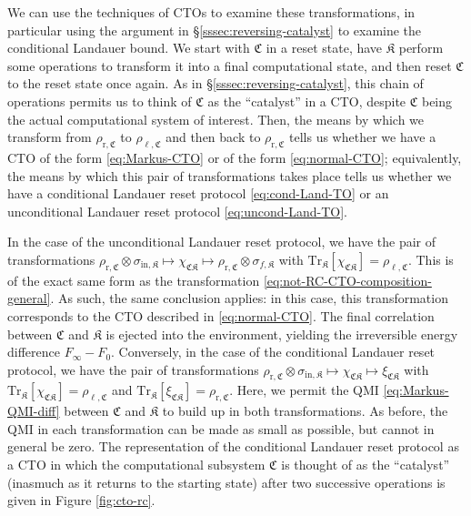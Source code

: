 \documentclass[preprints,article,accept,moreauthors,pdftex]{Definitions/mdpi}
\begin{document}
\begin{paracol}{2}
We can use the techniques of CTOs to examine these transformations, in particular using the argument in \S\ref{sssec:reversing-catalyst} to examine the conditional Landauer bound. We start with $\mathfrak{C}$ in a reset state, have $\mathfrak{K}$ perform some operations to transform it into a final computational state, and then reset $\mathfrak{C}$ to the reset state once again. As in \S\ref{sssec:reversing-catalyst}, this chain of operations permits us to think of $\mathfrak{C}$ as the ``catalyst'' in a CTO, despite $\mathfrak{C}$ being the actual computational system of interest. Then, the means by which we transform from $\rho_{\mathrm{r},\mathfrak{C}}$ to $\rho_{\ell,\mathfrak{C}}$ and then back to $\rho_{\mathrm{r},\mathfrak{C}}$ tells us whether we have a CTO of the form \eqref{eq:Markus-CTO} or of the form \eqref{eq:normal-CTO}; equivalently, the means by which this pair of transformations takes place tells us whether we have a conditional Landauer reset protocol \eqref{eq:cond-Land-TO} or an unconditional Landauer reset protocol \eqref{eq:uncond-Land-TO}.

In the case of the unconditional Landauer reset protocol, we have the pair of transformations $\rho_{\mathrm{r},\mathfrak{C}}\otimes\sigma_{\mathrm{in},\mathfrak{K}}\mapsto\chi_{\mathfrak{CK}}\mapsto\rho_{\mathrm{r},\mathfrak{C}}\otimes\sigma_{f,\mathfrak{K}}$ with $\mathrm{Tr}_{\mathfrak{K}}\left[\chi_{\mathfrak{CK}}\right] = \rho_{\ell,\mathfrak{C}}$. This is of the exact same form as the transformation \eqref{eq:not-RC-CTO-composition-general}. As such, the same conclusion applies: in this case, this transformation corresponds to the CTO described in \eqref{eq:normal-CTO}. The final correlation between $\mathfrak{C}$ and $\mathfrak{K}$ is ejected into the environment, yielding the irreversible energy difference $F_{\infty} - F_{0}$. Conversely, in the case of the conditional Landauer reset protocol, we have the pair of transformations $\rho_{\mathrm{r},\mathfrak{C}}\otimes\sigma_{\mathrm{in},\mathfrak{K}}\mapsto\chi_{\mathfrak{CK}}\mapsto\xi_{\mathfrak{CK}}$ with $\mathrm{Tr}_{\mathfrak{K}}\left[\chi_{\mathfrak{CK}}\right] = \rho_{\ell,\mathfrak{C}}$ and $\mathrm{Tr}_{\mathfrak{K}}\left[\xi_{\mathfrak{CK}}\right] = \rho_{\mathrm{r},\mathfrak{C}}$. Here, we permit the QMI \eqref{eq:Markus-QMI-diff} between $\mathfrak{C}$ and $\mathfrak{K}$ to build up in both transformations. As before, the QMI in each transformation can be made as small as possible, but cannot in general be zero. The representation of the conditional Landauer reset protocol as a CTO in which the computational subsystem $\mathfrak{C}$ is thought of as the ``catalyst'' (inasmuch as it returns to the starting state) after two successive operations is given in Figure \ref{fig:cto-rc}.


\end{paracol}
\end{document}
